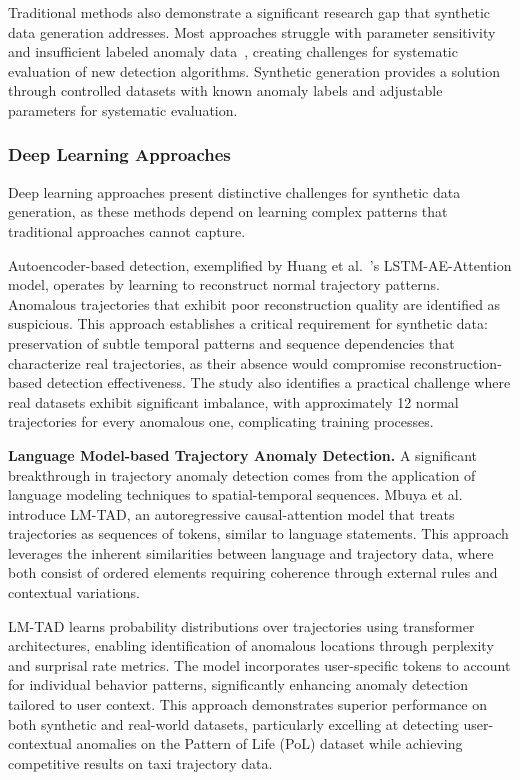 \documentclass[runningheads]{llncs}
\begin{document}
Traditional methods also demonstrate a significant research gap that synthetic data generation addresses. Most approaches struggle with parameter sensitivity and insufficient labeled anomaly data~\cite{zhangIBATDetectingAnomalous2011}, creating challenges for systematic evaluation of new detection algorithms. Synthetic generation provides a solution through controlled datasets with known anomaly labels and adjustable parameters for systematic evaluation.

\subsubsection{Deep Learning Approaches}
\label{sec:deep-learning}

Deep learning approaches present distinctive challenges for synthetic data generation, as these methods depend on learning complex patterns that traditional approaches cannot capture.

Autoencoder-based detection, exemplified by Huang et al.~\cite{huangLSTMAutoencodersAttention2021}'s LSTM-AE-Attention model, operates by learning to reconstruct normal trajectory patterns. Anomalous trajectories that exhibit poor reconstruction quality are identified as suspicious. This approach establishes a critical requirement for synthetic data: preservation of subtle temporal patterns and sequence dependencies that characterize real trajectories, as their absence would compromise reconstruction-based detection effectiveness. The study also identifies a practical challenge where real datasets exhibit significant imbalance, with approximately 12 normal trajectories for every anomalous one, complicating training processes.

\textbf{Language Model-based Trajectory Anomaly Detection.} A significant breakthrough in trajectory anomaly detection comes from the application of language modeling techniques to spatial-temporal sequences. Mbuya et al.~\cite{mbuyaTrajectoryAnomalyDetection2024} introduce LM-TAD, an autoregressive causal-attention model that treats trajectories as sequences of tokens, similar to language statements. This approach leverages the inherent similarities between language and trajectory data, where both consist of ordered elements requiring coherence through external rules and contextual variations.

LM-TAD learns probability distributions over trajectories using transformer architectures, enabling identification of anomalous locations through perplexity and surprisal rate metrics. The model incorporates user-specific tokens to account for individual behavior patterns, significantly enhancing anomaly detection tailored to user context. This approach demonstrates superior performance on both synthetic and real-world datasets, particularly excelling at detecting user-contextual anomalies on the Pattern of Life (PoL) dataset while achieving competitive results on taxi trajectory data.
\end{document}
